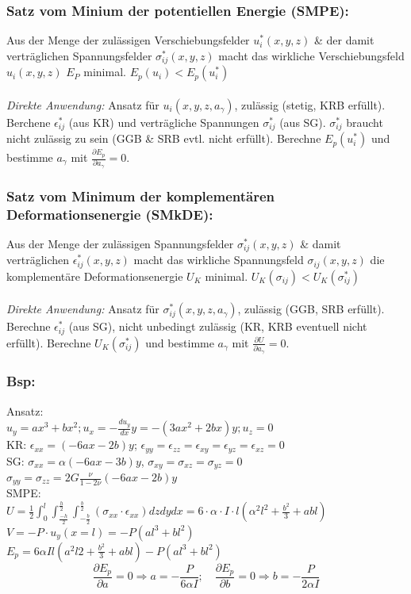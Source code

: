 \documentclass[a4paper,10pt]{article}
\begin{document}
\begin{multicols*}{3}
        \subsubsection{Satz vom Minium der potentiellen Energie (SMPE):}
            Aus der Menge der zulässigen Verschiebungsfelder $u_i^*(x,y,z)$ \& der damit verträglichen Spannungsfelder $\sigma_{ij}^*(x,y,z)$ macht das wirkliche Verschiebungsfeld $u_i(x,y,z)$ $E_P$ minimal. $E_p(u_i) < E_p(u_i^*)$\\\\
            \textit{Direkte Anwendung:} Ansatz für $u_i(x,y,z,a_\gamma)$, zulässig (stetig, KRB erfüllt). Berchene $\epsilon_{ij}^*$ (aus KR) und verträgliche Spannungen $\sigma_{ij}^*$ (aus SG). $\sigma_{ij}^*$ braucht nicht zulässig zu sein (GGB \& SRB evtl. nicht erfüllt). Berechne $E_p(u_i^*)$ und bestimme $a_\gamma$ mit $\frac{\partial E_p}{\partial a_\gamma}=0$.
        \subsubsection{Satz vom Minimum der komplementären Deformationsenergie (SMkDE):}
            Aus der Menge der zulässigen Spannungsfelder $\sigma_{ij}^*(x,y,z)$ \& damit verträglichen $\epsilon_{ij}^*(x,y,z)$ macht das wirkliche Spannungsfeld $\sigma_{ij}(x,y,z)$ die komplementäre Deformationsenergie $U_K$ minimal. $U_K(\sigma_{ij}) < U_K(\sigma_{ij}^*)$\\\\
            \textit{Direkte Anwendung:} Ansatz für $\sigma_{ij}^*(x,y,z,a_\gamma)$, zulässig (GGB, SRB erfüllt). Berechne $\epsilon_{ij}^*$ (aus SG), nicht unbedingt zulässig (KR, KRB eventuell nicht erfüllt). Berechne $U_K(\sigma_{ij}^*)$ und bestimme $a_\gamma$ mit $\frac{\partial U}{\partial a_\gamma}=0$.
        \subsubsection{Bsp:}
            Ansatz:\\
            $u_y=ax^3+bx^2; u_x=-\frac{du_y}{dx}y= -(3ax^2+2bx)y; u_z = 0$\\
            KR: $\epsilon_{xx} =(-6ax-2b)y$; $\epsilon_{yy}=\epsilon_{zz}=\epsilon_{xy}=\epsilon_{yz} = \epsilon_{xz}=0$\\
            SG: $\sigma_{xx} = \alpha(-6ax-3b)y$, $\sigma_{xy}=\sigma_{xz}=\sigma_{yz}=0$\\ $\sigma_{yy}=\sigma_{zz}=2G\frac{\nu}{1-2\nu}(-6ax-2b)y$\\
            SMPE:\\
            $U=\frac{1}{2}\int_0^l\int_\frac{-h}{2}^\frac{h}{2}\int_{-\frac{b}{2}}^\frac{b}{2}(\sigma_{xx}\cdot\epsilon_{xx})dzdydx=6\cdot\alpha\cdot I\cdot l(\alpha^2l^2+\frac{b^2}{3}+abl)$\\
            $V=-P\cdot u_y(x=l)=-P(al^3+bl^2)$\\
            $E_p=6\alpha Il(a^2l2+\frac{b^2}{3}+abl)-P(al^3+bl^2)$
            \[\frac{\partial E_p}{\partial a} = 0 \Rightarrow a=-\frac{P}{6\alpha I};\quad\frac{\partial E_p}{\partial b} = 0 \Rightarrow b=-\frac{P}{2\alpha I}\]

\end{multicols*}
\end{document}
